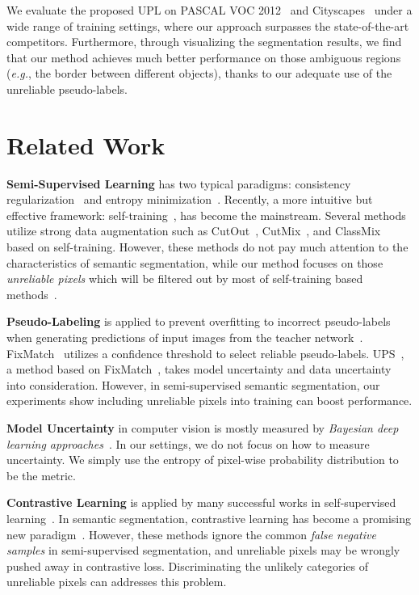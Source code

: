 \documentclass[10pt, twocolumn, letterpaper]{article}
\begin{document}
We evaluate the proposed UPL on PASCAL VOC 2012~\cite{voc} and Cityscapes~\cite{cityscapes} under a wide range of training settings, where our approach surpasses the state-of-the-art competitors.
Furthermore, through visualizing the segmentation results, we find that our method achieves much better performance on those ambiguous regions (\textit{e.g.}, the border between different objects), thanks to our adequate use of the unreliable pseudo-labels.


\section{Related Work}\label{sec:related}


\noindent\textbf{Semi-Supervised Learning} has two typical paradigms: consistency regularization~\cite{bachman2014learning, cct, french2019semi, sajjadi2016regularization, dash} and entropy minimization~\cite{em, chen2021semisupervised}. 
Recently, a more intuitive but effective framework: self-training~\cite{lee2013pseudo}, has become the mainstream.
Several methods~\cite{french2019semi, yuan2021simple, st++} utilize strong data augmentation such as CutOut~\cite{cutout}, CutMix~\cite{cutmix}, and ClassMix~\cite{classmix} based on self-training. 
However, these methods do not pay much attention to the characteristics of semantic segmentation, while our method focuses on those \textit{unreliable pixels} which will be filtered out by most of self-training based methods~\cite{yuan2021simple, st++, ups}.


\noindent\textbf{Pseudo-Labeling} is applied to prevent overfitting to incorrect pseudo-labels when generating predictions of input images from the teacher network~\cite{lee2013pseudo, arazo2020pseudo}.
FixMatch~\cite{fixmatch} utilizes a confidence threshold to select reliable pseudo-labels.
UPS~\cite{ups}, a method based on FixMatch~\cite{fixmatch}, takes model uncertainty and data uncertainty into consideration. 
However, in semi-supervised semantic segmentation, our experiments show including unreliable pixels into training can boost performance.


\noindent\textbf{Model Uncertainty} in computer vision is mostly measured by \textit{Bayesian deep learning approaches}~\cite{der2009aleatory, kendall2017uncertainties, mukhoti2018evaluating}.
In our settings, we do not focus on how to measure uncertainty.
We simply use the entropy of pixel-wise probability distribution to be the metric.


\noindent\textbf{Contrastive Learning} is applied by many successful works in self-supervised learning~\cite{simclrv2, mocov3, byol}.
In semantic segmentation, contrastive learning has become a promising new paradigm~\cite{reco, wang2021exploring, zhao2021contrastive, alonso2021semi, zhou2021c3}. 
However, these methods ignore the common \textit{false negative samples} in semi-supervised segmentation, and unreliable pixels may be wrongly pushed away in contrastive loss.
Discriminating the unlikely categories of unreliable pixels can addresses this problem.
\end{document}
